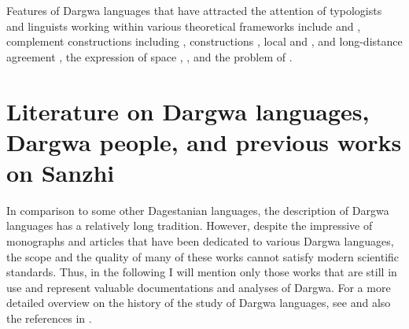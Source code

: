 Features of Dargwa languages that have attracted the attention of typologists and linguists working within various theoretical frameworks include  and  \citep{Sumbatova2011, Sumbatova2013, Belyaev2013, Belyaev2017a, Belyaev2017b, GanenkovForthcoming, Forker2016a}, complement constructions including  \citep{Ganenkov2012, ForkerSubmittedb},  constructions \citep{Comrie.vandenBerg2006, Ganenkov2006, Ganenkov2013}, local and  \citep{Forker2014},  and long-distance agreement \citep{Serdobolskaya2009, Serdobolskaya2010, Belyaev2016}, the expression of space \citep{Ganenkov2010, ForkerLTSanzhi},  \citep{Sumbatova2009, Forker.Belyaev2016, Forker2016a}, and the problem of  \citep{Kalinina.Sumbatova2007}.



\section[Literature and previous works]{Literature on Dargwa languages, Dargwa people, and previous works on Sanzhi}\largerpage
\label{sec:Literature on Dargwa languages, Dargwa people, and previous works on Sanzhi}

In comparison to some other Dagestanian languages, the description of Dargwa languages has a relatively long tradition. However, despite the impressive  of monographs and articles that have been dedicated to various Dargwa languages, the scope and the quality of many of these works cannot satisfy modern scientific standards. Thus, in the following I will mention only those works that are still in use and represent valuable documentations and analyses of Dargwa. For a more detailed overview on the history of the study of Dargwa languages, see \citet{Magometov1983} and also the references in \citet{Temirbulatova2005}.

